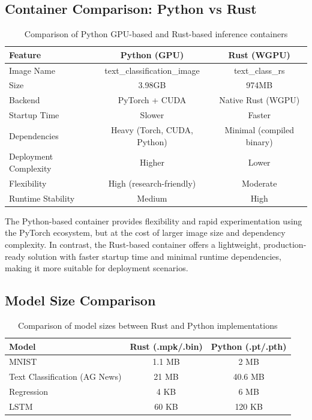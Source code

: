 \documentclass[10pt,a4paper,twocolumn]{article}
\begin{document}
\newpage

\subsection{Container Comparison: Python vs Rust}

\begin{table}[t!]
\centering
\begin{tabular}{|l|c|c|}
\hline
\textbf{Feature} & \textbf{Python (GPU)} & \textbf{Rust (WGPU)} \\
\hline
Image Name & text\_classification\_image & text\_class\_rs \\
\hline
Size &  3.98GB &  974MB \\
\hline
Backend & PyTorch + CUDA & Native Rust (WGPU) \\
\hline
Startup Time & Slower & Faster \\
\hline
Dependencies & Heavy (Torch, CUDA, Python) & Minimal (compiled binary) \\
\hline
Deployment Complexity & Higher & Lower \\
\hline
Flexibility & High (research-friendly) & Moderate \\
\hline
Runtime Stability & Medium & High \\
\hline
\end{tabular}
\caption{Comparison of Python GPU-based and Rust-based inference containers}
\end{table}

\noindent
The Python-based container provides flexibility and rapid experimentation using the PyTorch ecosystem, but at the cost of larger image size and dependency complexity. In contrast, the Rust-based container offers a lightweight, production-ready solution with faster startup time and minimal runtime dependencies, making it more suitable for deployment scenarios.


\subsection{Model Size Comparison}

\begin{table}[t!]
\centering
\begin{tabular}{|l|c|c|}
\hline
\textbf{Model} & \textbf{Rust (.mpk/.bin)} & \textbf{Python (.pt/.pth)} \\
\hline
MNIST & 1.1 MB & 2 MB \\
\hline
Text Classification (AG News) & 21 MB & 40.6 MB \\
\hline
Regression & 4 KB & 6 MB \\
\hline
LSTM & 60 KB & 120 KB \\
\hline
\end{tabular}
\caption{Comparison of model sizes between Rust and Python implementations}
\end{table}
\end{document}
